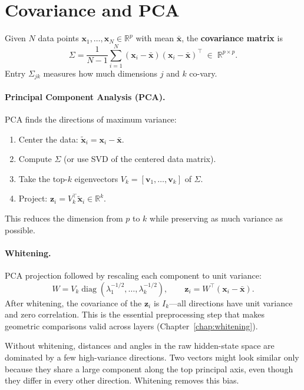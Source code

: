 \documentclass[11pt, twoside, openright]{memoir}
\begin{document}
\section{Covariance and PCA}
\label{sec:covariance-pca}

Given $N$ data points $\mathbf{x}_1,\ldots,\mathbf{x}_N \in \mathbb{R}^p$
with mean $\bar{\mathbf{x}}$, the \textbf{covariance matrix} is
\[
  \Sigma = \frac{1}{N-1}\sum_{i=1}^{N}
  (\mathbf{x}_i - \bar{\mathbf{x}})
  (\mathbf{x}_i - \bar{\mathbf{x}})^\top
  \;\in\; \mathbb{R}^{p \times p}.
\]
Entry $\Sigma_{jk}$ measures how much dimensions $j$ and $k$ co-vary.

\paragraph{Principal Component Analysis (PCA).}
PCA finds the directions of maximum variance:
\begin{enumerate}[nosep]
  \item Center the data: $\tilde{\mathbf{x}}_i = \mathbf{x}_i -
    \bar{\mathbf{x}}$.
  \item Compute $\Sigma$ (or use SVD of the centered data matrix).
  \item Take the top-$k$ eigenvectors $V_k = [\mathbf{v}_1,\ldots,
    \mathbf{v}_k]$ of $\Sigma$.
  \item Project: $\mathbf{z}_i = V_k^\top \tilde{\mathbf{x}}_i \in
    \mathbb{R}^k$.
\end{enumerate}
This reduces the dimension from $p$ to $k$ while preserving as much
variance as possible.

\paragraph{Whitening.}
PCA projection followed by rescaling each component to unit variance:
\[
  W = V_k \operatorname{diag}(\lambda_1^{-1/2},\ldots,\lambda_k^{-1/2}),
  \qquad \mathbf{z}_i = W^\top (\mathbf{x}_i - \bar{\mathbf{x}}).
\]
After whitening, the covariance of the $\mathbf{z}_i$ is $I_k$---all
directions have unit variance and zero correlation.  This is the essential
preprocessing step that makes geometric comparisons valid across layers
(Chapter~\ref{chap:whitening}).

\begin{pitfall}
Without whitening, distances and angles in the raw hidden-state space are
dominated by a few high-variance directions.  Two vectors might look
similar only because they share a large component along the top principal
axis, even though they differ in every other direction.  Whitening removes
this bias.
\end{pitfall}
\end{document}
